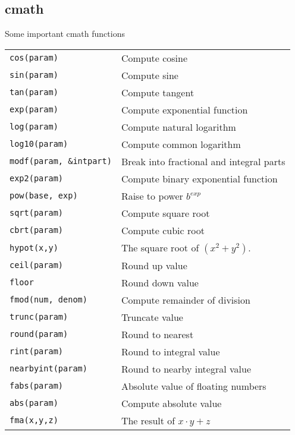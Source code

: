\subsection{cmath}
Some important cmath functions
\begin{center}
	\renewcommand\tabularxcolumn[1]{m{#1}}
	\begin{tabularx}{\columnwidth}{ | l  X | } 
		\hline
		\texttt{cos(param)}		&Compute cosine \\
		\texttt{sin(param)}		&Compute sine \\
		\texttt{tan(param)}		&Compute tangent \\
		\texttt{exp(param)}		&Compute exponential function\\
		\texttt{log(param)}		&Compute natural logarithm \\
		\texttt{log10(param)}	&Compute common logarithm \\
		\texttt{modf(param, \&intpart)} & Break into fractional and integral parts\\
		\texttt{exp2(param)} &Compute binary exponential function \\
		\texttt{pow(base, exp)} &Raise to power $b^{exp}$	\\
		\texttt{sqrt(param)} &Compute square root 	\\
		\texttt{cbrt(param)} &Compute cubic root 	\\
		\texttt{hypot(x,y)} & The square root of $(x^2+y^2)$.	\\
		\texttt{ceil(param)} & Round up value	\\
		\texttt{floor} &Round down value	\\
		\texttt{fmod(num, denom)} &	Compute remainder of division\\
		\texttt{trunc(param)} &Truncate value	\\
		\texttt{round(param)} &	Round to nearest \\
		\texttt{rint(param)} &Round to integral value	\\
		\texttt{nearbyint(param)} &Round to nearby integral value	\\
		\texttt{fabs(param)} & Absolute value of floating numbers	\\
		\texttt{abs(param)} &Compute absolute value \\
		\texttt{fma(x,y,z)} &The result of $x\cdot y+z$	\\
		\hline
	\end{tabularx}
\end{center}